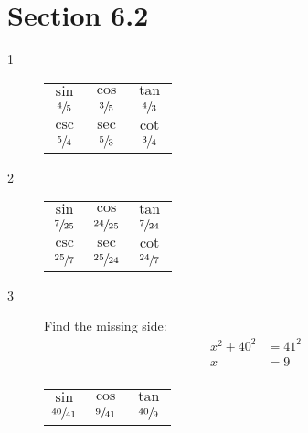 \documentclass{exam}
\begin{document}
  \ifprintanswers

    \section{Section 6.2}
    \begin{description}

      \item[1] 
        \begin{tabular}[H]{ccc}
          \toprule

          $\sin$         & $\cos$         & $\tan$         \\
          $\sfrac{4}{5}$ & $\sfrac{3}{5}$ & $\sfrac{4}{3}$ \\

          \midrule
          $\csc$         & $\sec$         & $\cot$ \\
          $\sfrac{5}{4}$ & $\sfrac{5}{3}$ & $\sfrac{3}{4}$ \\

          \bottomrule
        \end{tabular}

      \item[2] 
        \begin{tabular}[H]{ccc}
          \toprule

          $\sin$          & $\cos$           & $\tan$          \\
          $\sfrac{7}{25}$ & $\sfrac{24}{25}$ & $\sfrac{7}{24}$ \\

          \midrule

          $\csc$          & $\sec$           & $\cot$ \\
          $\sfrac{25}{7}$ & $\sfrac{25}{24}$ & $\sfrac{24}{7}$ \\

          \bottomrule
        \end{tabular}

      \item[3] 
        Find the missing side:
        \begin{align*}
          x^2 + 40^2 & = 41^2 \\
          x          & = 9 \\
        \end{align*}

        \begin{tabular}[H]{ccc}
          \toprule

          $\sin$           & $\cos$          & $\tan$          \\
          $\sfrac{40}{41}$ & $\sfrac{9}{41}$ & $\sfrac{40}{9}$ \\


\end{tabular}
\end{description}
\end{document}
